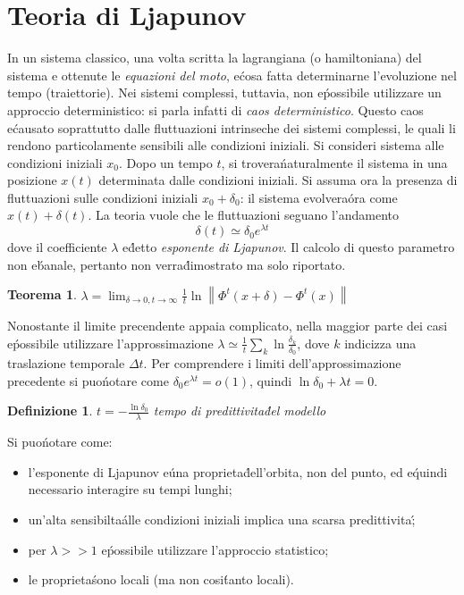 \documentclass[12pt, a4paper]{book}
\theoremstyle{theorem}
\newtheorem{definition}{Definizione}[section]
\newtheorem{theorem}{Teorema}[section]
\begin{document}
		\section{Teoria di Ljapunov}
			In un sistema classico, una volta scritta la lagrangiana (o hamiltoniana) del sistema e ottenute le \emph{equazioni del moto}, e\' cosa fatta determinarne l'evoluzione nel tempo (traiettorie).
			Nei sistemi complessi, tuttavia, non e\' possibile utilizzare un approccio deterministico: si parla infatti di \emph{caos deterministico}.
			Questo caos e\' causato soprattutto dalle fluttuazioni intrinseche dei sistemi complessi, le quali li rendono particolamente sensibili alle condizioni iniziali.
			Si consideri sistema alle condizioni iniziali $x_{0}$.
			Dopo un tempo $t$, si trovera\' naturalmente il sistema in una posizione $x(t)$ determinata dalle condizioni iniziali.
			Si assuma ora la presenza di fluttuazioni sulle condizioni iniziali $x_{0}+\delta_{0}$: il sistema evolvera\' ora come $x(t)+\delta(t)$.
			La teoria vuole che le fluttuazioni seguano l'andamento
			\begin{equation*}
				\delta(t)\simeq\delta_{0}e^{\lambda t}
			\end{equation*}
			dove il coefficiente $\lambda$ e\' detto \emph{esponente di Ljapunov}.
			Il calcolo di questo parametro non e\' banale, pertanto non verra\' dimostrato ma solo riportato.
			\begin{theorem}
				$\lambda=\lim_{\delta\to0,t\to\infty}\frac{1}{t}\ln\left\lVert \Phi^{t}(x+\delta)-\Phi^{t}(x) \right\rVert$
			\end{theorem}
			Nonostante il limite precendente appaia complicato, nella maggior parte dei casi e\' possibile utilizzare l'approssimazione $\lambda\simeq\frac{1}{t}\sum_{k}\ln\frac{\delta_{k}}{\delta_{0}}$, dove $k$ indicizza una traslazione temporale $\Delta t$. 
			Per comprendere i limiti dell'approssimazione precedente si puo\' notare come $\delta_{0}e^{\lambda t}=o(1)$, quindi $\ln\delta_{0}+\lambda t=0$.
			\begin{definition}
				$t=-\frac{\ln\delta_{0}}{\lambda}$ tempo di predittivita\' del modello	
			\end{definition}
			Si puo\' notare come:
			\begin{itemize}
				\item l'esponente di Ljapunov e\' una proprieta\' dell'orbita, non del punto, ed e\' quindi necessario interagire su tempi lunghi;
				\item un'alta sensibilta\' alle condizioni iniziali implica una scarsa predittivita\';
				\item per $\lambda>>1$ e\' possibile utilizzare l'approccio statistico;
				\item le proprieta\' sono locali (ma non cosi\' tanto locali).
			\end{itemize}
\end{document}

